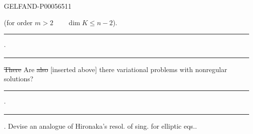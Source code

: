 \begin{GelfandAdjacentEvidence}{GELFAND-P000565}{11}

(for order \(m>2\qquad\dim K\leqslant n-2\)).

\noindent\hfill\rule{1.1cm}{.32pt}\enspace\(\cdot\)\enspace\rule{.9cm}{.32pt}\par
\sout{There} Are \sout{also} [inserted above] there variational problems with nonregular solutions?
\end{GelfandAdjacentEvidence}

\noindent\hfill\rule{1.1cm}{.32pt}\enspace\(\cdot\)\enspace\rule{.9cm}{.32pt}\par
{}. Devise an analogue of Hironaka’s resol. of sing. for elliptic eqs..


